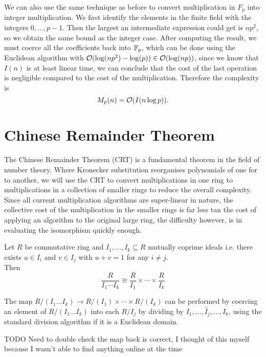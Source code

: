 We can also use the same technique as before to convert multiplication in $F_p$ into integer multiplication. We first identify the elements in the finite field with the integers $0,\ldots, p-1$. Then the largest an intermediate expression could get is $np^2$, so we obtain the same bound as the integer case. After computing the result, we must coerce all the coefficients back into ${\mathbb F}_p$, which can be done using the Euclidean algorithm with $\mathcal O(\log(np^2) - \log (p)) \in \mathcal O(\log (np))$, since we know that $I(n)$ is at least linear time, we can conclude that the cost of the last operation is negligible compared to the cost of the multiplication. Therefore the complexity is
\[
    M_p(n) = \mathcal O(I(n \log p)).
\]

\section{Chinese Remainder Theorem}%
\label{sec:crt}

The Chinese Remainder Theorem (CRT) is a fundamental theorem in the field of number theory. Where Kronecker substitution reorganises polynomials of one for to another, we will use the CRT to convert multiplications in one ring to multiplications in a collection of smaller rings to reduce the overall complexity. Since all current multiplication algorithms are super-linear in nature, the collective cost of the multiplication in the smaller rings is far less tan the cost of applying an algorithm to the original large ring, the difficulty however, is in evaluating the isomorphism quickly enough.

\begin{theorem}
    Let $R$ be commutative ring and $I_1, \ldots, I_k \subseteq R$ mutually coprime ideals i.e. there exists $u \in I_i$ and $v \in I_j$ with $u + v = 1$ for any $i \neq j$.\\
    Then
    \[
        \frac{R}{I_1\cdots I_k} \cong \frac{R}{I_1} \times \cdots \times \frac{R}{I_k}
    \]
\end{theorem}

\medskip

The map $R/(I_1\ldots I_k) \to R/(I_1) \times \cdots \times R/(I_k)$ can be performed by coercing an element of $R/(I_1 \ldots I_k)$ into each $R / I_j$ by dividing by $I_1, \ldots, \hat{I}_j, \ldots, I_k$, using the standard division algorithm if it is a Euclidean domain.

\medskip
TODO Need to double check the map back is correct, I thought of this myself because I wasn't able to find anything online at the time

